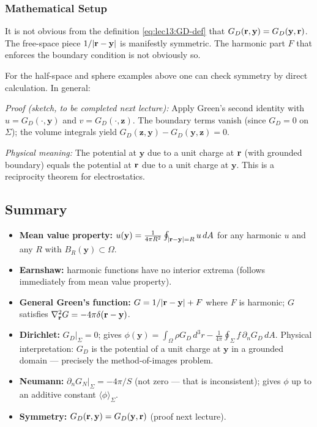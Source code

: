 \subsubsection*{Mathematical Setup}
It is not obvious from the definition \eqref{eq:lec13:GD-def} that
$G_D(\mathbf{r},\mathbf{y}) = G_D(\mathbf{y},\mathbf{r})$.
The free-space piece $1/|\mathbf{r}-\mathbf{y}|$ is manifestly symmetric.  The harmonic part
$F$ that enforces the boundary condition is not obviously so.

For the half-space and sphere examples above one can check symmetry by direct calculation.
In general:


\textit{Proof (sketch, to be completed next lecture):} Apply Green's second identity with
$u = G_D(\cdot,\mathbf{y})$ and $v = G_D(\cdot,\mathbf{z})$.  The boundary terms vanish
(since $G_D = 0$ on $\Sigma$); the volume integrals yield
$G_D(\mathbf{z},\mathbf{y}) - G_D(\mathbf{y},\mathbf{z}) = 0$.

\textit{Physical meaning:} The potential at $\mathbf{y}$ due to a unit charge at $\mathbf{r}$
(with grounded boundary) equals the potential at $\mathbf{r}$ due to a unit charge at $\mathbf{y}$.
This is a reciprocity theorem for electrostatics.

\subsection{Summary}\label{subsec:lec13-summary}

\begin{itemize}
  \item \textbf{Mean value property:} $u(\mathbf{y}) = \frac{1}{4\pi R^2}\oint_{|\mathbf{r}-\mathbf{y}|=R} u\, dA$
        for any harmonic $u$ and any $R$ with $B_R(\mathbf{y})\subset\Omega$.
  \item \textbf{Earnshaw:} harmonic functions have no interior extrema (follows immediately
        from mean value property).
  \item \textbf{General Green's function:} $G = 1/|\mathbf{r}-\mathbf{y}| + F$ where $F$ is
        harmonic; $G$ satisfies $\nabla^2_{\mathbf{r}} G = -4\pi\delta(\mathbf{r}-\mathbf{y})$.
  \item \textbf{Dirichlet:} $G_D|_\Sigma = 0$; gives
        $\phi(\mathbf{y}) = \int_\Omega\rho G_D\,d^3r
        - \frac{1}{4\pi}\oint_\Sigma f\,\partial_n G_D\,dA$.
        Physical interpretation: $G_D$ is the potential of a unit charge at $\mathbf{y}$
        in a grounded domain — precisely the method-of-images problem.
  \item \textbf{Neumann:} $\partial_n G_N|_\Sigma = -4\pi/S$ (not zero — that is
        inconsistent); gives $\phi$ up to an additive constant $\langle\phi\rangle_\Sigma$.
  \item \textbf{Symmetry:} $G_D(\mathbf{r},\mathbf{y}) = G_D(\mathbf{y},\mathbf{r})$ (proof next lecture).
\end{itemize}
